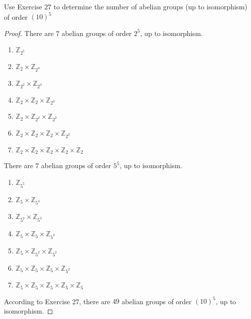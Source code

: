 \begin{exercise}
    Use Exercise 27 to determine the number of abelian groups (up to isomorphism) of order ${(10)}^{5}$
\end{exercise}

\begin{proof}
    There are $7$ abelian groups of order $2^{5}$, up to isomorphism.
    \begin{enumerate}
        \item $\mathbb{Z}_{2^{5}}$
        \item $\mathbb{Z}_{2} \times \mathbb{Z}_{2^{4}}$
        \item $\mathbb{Z}_{2^{2}} \times \mathbb{Z}_{2^{3}}$
        \item $\mathbb{Z}_{2} \times \mathbb{Z}_{2} \times \mathbb{Z}_{2^{3}}$
        \item $\mathbb{Z}_{2} \times \mathbb{Z}_{2^{2}} \times \mathbb{Z}_{2^{2}}$
        \item $\mathbb{Z}_{2} \times \mathbb{Z}_{2} \times \mathbb{Z}_{2} \times \mathbb{Z}_{2^{2}}$
        \item $\mathbb{Z}_{2} \times \mathbb{Z}_{2} \times \mathbb{Z}_{2} \times \mathbb{Z}_{2} \times \mathbb{Z}_{2}$
    \end{enumerate}

    There are $7$ abelian groups of order $5^{5}$, up to isomorphism.
    \begin{enumerate}
        \item $\mathbb{Z}_{5^{5}}$
        \item $\mathbb{Z}_{5} \times \mathbb{Z}_{5^{4}}$
        \item $\mathbb{Z}_{5^{2}} \times \mathbb{Z}_{5^{3}}$
        \item $\mathbb{Z}_{5} \times \mathbb{Z}_{5} \times \mathbb{Z}_{5^{3}}$
        \item $\mathbb{Z}_{5} \times \mathbb{Z}_{5^{2}} \times \mathbb{Z}_{5^{2}}$
        \item $\mathbb{Z}_{5} \times \mathbb{Z}_{5} \times \mathbb{Z}_{5} \times \mathbb{Z}_{5^{2}}$
        \item $\mathbb{Z}_{5} \times \mathbb{Z}_{5} \times \mathbb{Z}_{5} \times \mathbb{Z}_{5} \times \mathbb{Z}_{5}$
    \end{enumerate}

    According to Exercise 27, there are $49$ abelian groups of order ${(10)}^{5}$, up to isomorphism.
\end{proof}

